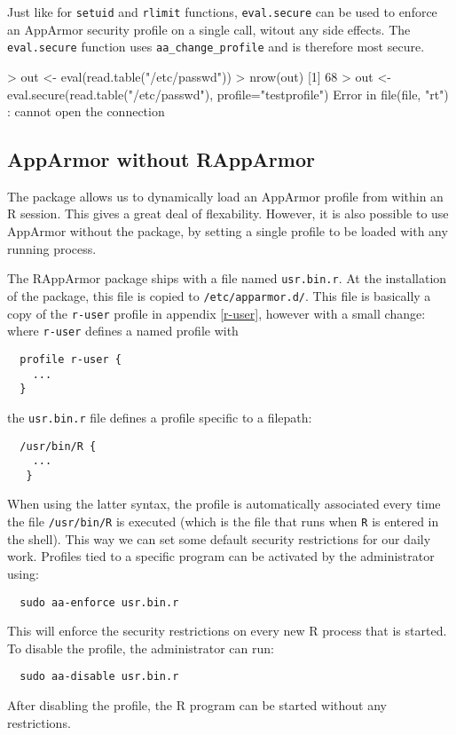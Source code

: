 \documentclass[article]{jss}
\begin{document}
Just like for \texttt{setuid} and \texttt{rlimit} functions,
\texttt{eval.secure} can be used to enforce an AppArmor security profile on a
single call, witout any side effects. The \texttt{eval.secure} function uses
\texttt{aa\_change\_profile} and is therefore most secure.

\begin{CodeChunk}
\begin{CodeInput}
> out <- eval(read.table("/etc/passwd"))
> nrow(out)
[1] 68
> out <- eval.secure(read.table("/etc/passwd"), profile="testprofile")
Error in file(file, "rt") : cannot open the connection
\end{CodeInput}
\end{CodeChunk}

\subsection{AppArmor without RAppArmor}
\label{usr.bin.r}

The  package allows us to dynamically load an AppArmor profile
from within an R session. This gives a great deal of flexability. However, it is
also possible to use AppArmor without the  package, by setting a
single profile to be loaded with any running  process.

The RAppArmor package ships with a file named \texttt{usr.bin.r}. At the
installation of the package, this file is copied to \texttt{/etc/apparmor.d/}.
This file is basically a copy of the \texttt{r-user} profile in appendix
\ref{r-user}, however with a small change: where \texttt{r-user} defines
a named profile with 
\begin{verbatim}
  profile r-user {
    ...
  } 
\end{verbatim}
the \texttt{usr.bin.r} file defines a profile specific to a filepath:
\begin{verbatim}
  /usr/bin/R {
    ...
   } 
\end{verbatim}

When using the latter syntax, the profile is automatically associated every time
the file \texttt{/usr/bin/R} is executed (which is the file that runs when
\texttt{R} is entered in the shell). This way we can set some default security
restrictions for our daily work. Profiles tied to a specific program can be
activated by the administrator using:
\begin{verbatim}
  sudo aa-enforce usr.bin.r
\end{verbatim}
This will enforce the security restrictions on every new R process that is
started. To disable the profile, the administrator can run:
\begin{verbatim}
  sudo aa-disable usr.bin.r
\end{verbatim}
After disabling the profile, the R program can be started without any
restrictions. 
\end{document}
